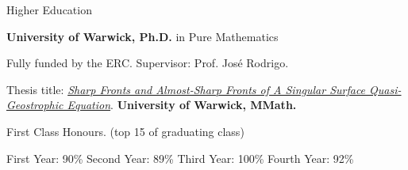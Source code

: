 \begin{rubric}{Higher Education}

\entry*[2015 -- 2019]%
	\textbf{University of Warwick, Ph.D.}  in Pure Mathematics	\par  Fully funded by the ERC. Supervisor: Prof. Jos\'e Rodrigo. \par Thesis title: \href{http://wrap.warwick.ac.uk/150235}{\emph{Sharp Fronts and Almost-Sharp Fronts of A Singular Surface Quasi-Geostrophic Equation}}.
%
\entry*[2011 -- 2015]%
	\textbf{University of Warwick, MMath.}\par
	First Class Honours. (top 15 of graduating class)
	\par
	    First Year: 90\% \hspace{1.4em} Second Year: 89\% \hspace{1.4em}  Third Year: 100\% \hspace{1.4em}  Fourth Year: 92\%
 \end{rubric}
